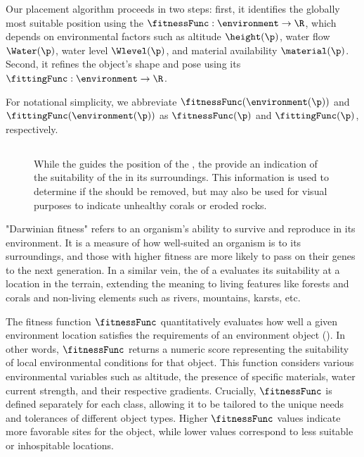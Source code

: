 Our placement algorithm proceeds in two steps: first, it identifies the globally most suitable position using the  $\fitnessFunc: \environment \to \R$, which depends on environmental factors such as altitude $\height(\p)$, water flow $\Water(\p)$, water level $\Wlevel(\p)$, and material availability $\material(\p)$. Second, it refines the object's shape and pose using its  $\fittingFunc: \environment \to \R$.

For notational simplicity, we abbreviate $\fitnessFunc(\environment(\p))$ and $\fittingFunc(\environment(\p))$ as $\fitnessFunc(\p)$ and $\fittingFunc(\p)$, respectively.

\subsection{ }

\begin{figure}
    \caption{While the  guides the position of the , the  provide an indication of the suitability of the  in its surroundings. This information is used to determine if the  should be removed, but may also be used for visual purposes to indicate unhealthy corals or eroded rocks. }
    \label{fig:env-obj-procedural-erosion}
\end{figure}


"Darwinian fitness" refers to an organism's ability to survive and reproduce in its environment. It is a measure of how well-suited an organism is to its surroundings, and those with higher fitness are more likely to pass on their genes to the next generation. In a similar vein, the  of a  evaluates its suitability at a location in the terrain, extending the meaning to living features like forests and corals and non-living elements such as rivers, mountains, karsts, etc.

The fitness function $\fitnessFunc$ quantitatively evaluates how well a given environment location satisfies the requirements of an environment object (). In other words, $\fitnessFunc$ returns a numeric score representing the suitability of local environmental conditions for that object. This function considers various environmental variables such as altitude, the presence of specific materials, water current strength, and their respective gradients. Crucially, $\fitnessFunc$ is defined separately for each  class, allowing it to be tailored to the unique needs and tolerances of different object types. Higher $\fitnessFunc$ values indicate more favorable sites for the object, while lower values correspond to less suitable or inhospitable locations. 


